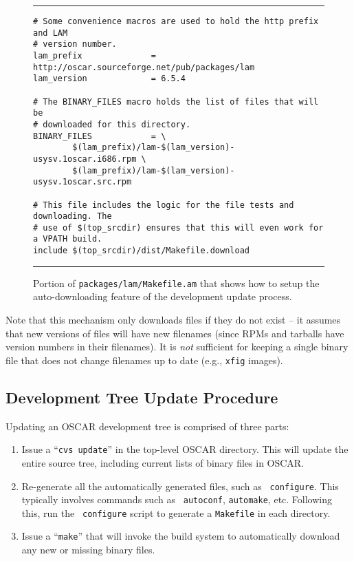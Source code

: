 \begin{figure}[tbp]
  \begin{center}
\hrule
\vspace{5pt}
\begin{verbatim}
# Some convenience macros are used to hold the http prefix and LAM
# version number.
lam_prefix              = http://oscar.sourceforge.net/pub/packages/lam
lam_version             = 6.5.4

# The BINARY_FILES macro holds the list of files that will be
# downloaded for this directory.
BINARY_FILES            = \
        $(lam_prefix)/lam-$(lam_version)-usysv.1oscar.i686.rpm \
        $(lam_prefix)/lam-$(lam_version)-usysv.1oscar.src.rpm

# This file includes the logic for the file tests and downloading. The
# use of $(top_srcdir) ensures that this will even work for a VPATH build.
include $(top_srcdir)/dist/Makefile.download
\end{verbatim}
\vspace{5pt}
\hrule
    \caption{Portion of {\tt packages/lam/Makefile.am} that shows how to setup the auto-downloading feature of the development update process.}
    \label{fig:makefile-bin-download}
  \end{center}
\end{figure}

Note that this mechanism only downloads files if they do not exist --
it assumes that new versions of files will have new filenames (since
RPMs and tarballs have version numbers in their filenames).  It is
{\em not} sufficient for keeping a single binary file that does not
change filenames up to date (e.g., {\tt xfig} images).


\subsection{Development Tree Update Procedure}

Updating an OSCAR development tree is comprised of three parts:

\begin{enumerate}
\item Issue a ``{\tt cvs update}'' in the top-level OSCAR directory.
  This will update the entire source tree, including current lists of
  binary files in OSCAR.
  
\item Re-generate all the automatically generated files, such as {\tt
    configure}.  This typically involves commands such as {\tt
    autoconf}, {\tt automake}, etc.  Following this, run the {\tt
    configure} script to generate a {\tt Makefile} in each directory.

\item Issue a ``{\tt make}'' that will invoke the build system to
  automatically download any new or missing binary files.
\end{enumerate}

